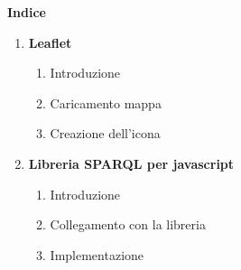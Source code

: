 \documentclass[a4paper,11pt]{article}
\begin{document}
\LARGE{\textbf{Indice}}
\bigskip
  
\begin{enumerate}
	\item \LARGE{\textbf{Leaflet}}
		\begin{enumerate}
			\Large
			\item Introduzione
			\item Caricamento mappa
			\item Creazione dell'icona
		\end{enumerate}
	\bigskip 
	\item \LARGE{\textbf{Libreria SPARQL per javascript}}
		\begin{enumerate}
			\Large
			\item Introduzione
			\item Collegamento con la libreria
			\item Implementazione
		\end{enumerate}
\end{enumerate}

\newpage
\end{document}
